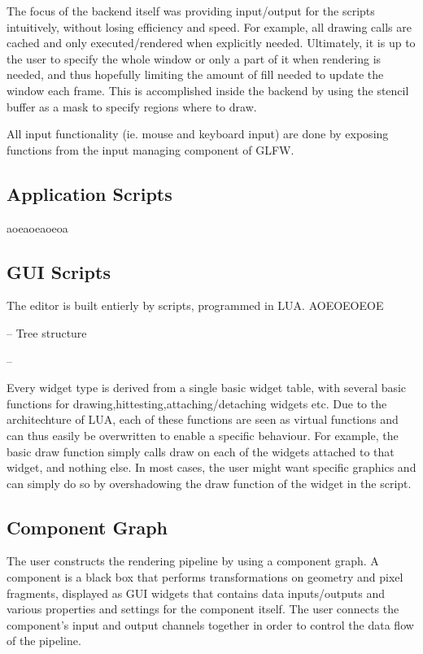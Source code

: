 The focus of the backend itself was providing input/output for the scripts intuitively, without losing efficiency and speed. For example, all drawing calls are cached and only executed/rendered when explicitly needed. Ultimately, it is up to the user to specify the whole window or only a part of it when rendering is needed, and thus hopefully limiting the amount of fill needed to update the window each frame. This is accomplished inside the backend by using the stencil buffer as a mask to specify regions where to draw.

All input functionality (ie. mouse and keyboard input) are done by exposing functions from the input managing component of GLFW.

\subsection{Application Scripts}
aoeaoeaoeoa


\subsection{GUI Scripts}

The editor is built entierly by scripts, programmed in LUA. AOEOEOEOE

-- Tree structure


-- 

Every widget type is derived from a single basic widget table, with several basic functions for drawing,hittesting,attaching/detaching widgets etc. Due to the architechture of LUA, each of these functions are seen as virtual functions and can thus easily be overwritten to enable a specific behaviour. For example, the basic draw function simply calls draw on each of the widgets attached to that widget, and nothing else. In most cases, the user might want specific graphics and can simply do so by overshadowing the draw function of the widget in the script. 

\subsection{Component Graph}
The user constructs the rendering pipeline by using a component graph. A component is a black box that performs transformations on geometry and pixel fragments, displayed as GUI widgets that contains data inputs/outputs and various properties and settings for the component itself. The user connects the component’s input and output channels together in order to control the data flow of the pipeline. 

